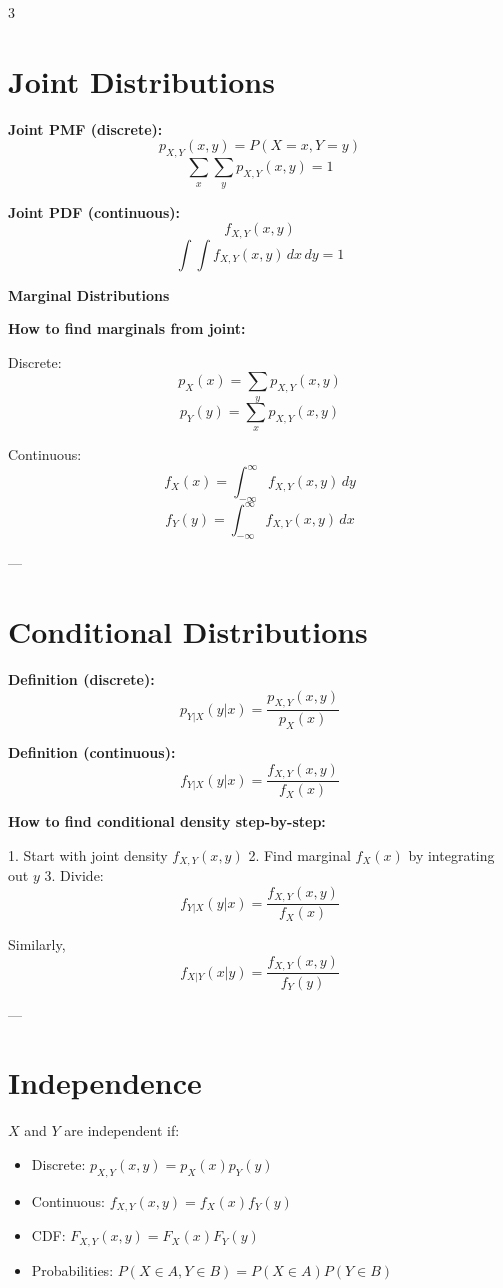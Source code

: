 \documentclass[10pt]{article}
\begin{document}
\begin{multicols}{3}
\section*{Joint Distributions}

\textbf{Joint PMF (discrete):}
\[
p_{X,Y}(x,y)=P(X=x,Y=y)
\]
\[
\sum_x \sum_y p_{X,Y}(x,y)=1
\]

\textbf{Joint PDF (continuous):}
\[
f_{X,Y}(x,y)
\]
\[
\int\int f_{X,Y}(x,y)\,dx\,dy=1
\]

\textbf{Marginal Distributions}

\textbf{How to find marginals from joint:}

Discrete:
\[
p_X(x)=\sum_y p_{X,Y}(x,y)
\]
\[
p_Y(y)=\sum_x p_{X,Y}(x,y)
\]

Continuous:
\[
f_X(x)=\int_{-\infty}^{\infty} f_{X,Y}(x,y)\,dy
\]
\[
f_Y(y)=\int_{-\infty}^{\infty} f_{X,Y}(x,y)\,dx
\]

---

\section*{Conditional Distributions}

\textbf{Definition (discrete):}
\[
p_{Y|X}(y|x)=\frac{p_{X,Y}(x,y)}{p_X(x)}
\]

\textbf{Definition (continuous):}
\[
f_{Y|X}(y|x)=\frac{f_{X,Y}(x,y)}{f_X(x)}
\]

\textbf{How to find conditional density step-by-step:}

1. Start with joint density $f_{X,Y}(x,y)$  
2. Find marginal $f_X(x)$ by integrating out $y$  
3. Divide:
\[
f_{Y|X}(y|x)=\frac{f_{X,Y}(x,y)}{f_X(x)}
\]

Similarly,
\[
f_{X|Y}(x|y)=\frac{f_{X,Y}(x,y)}{f_Y(y)}
\]

---

\section*{Independence}
$X$ and $Y$ are independent if:
\begin{itemize}
    \item Discrete: $p_{X,Y}(x,y)=p_X(x)p_Y(y)$
    \item Continuous: $f_{X,Y}(x,y)=f_X(x)f_Y(y)$
    \item CDF: $F_{X,Y}(x,y) = F_X(x)F_Y(y)$
    \item Probabilities: $P(X \in A, Y \in B) = P(X \in A)P(Y \in B)$
\end{itemize}


\end{multicols}
\end{document}
